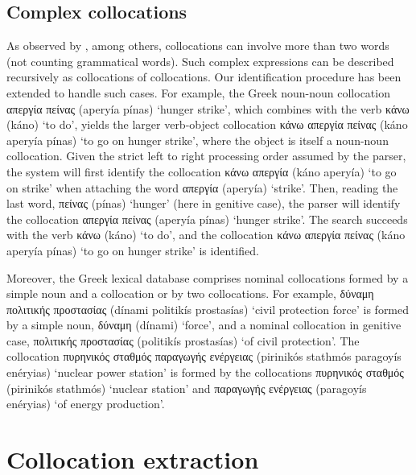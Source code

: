\documentclass[output=paper]{langsci/langscibook}
\begin{document}

\subsection{Complex collocations}
As observed by \cite{heid94}, among others, collocations can involve more than two words (not counting grammatical words). Such complex expressions can be described recursively as collocations of collocations. Our identification procedure has been extended to handle such cases. For example, the Greek noun-noun collocation {απεργία πείνας} (aperyía pínas) `hunger strike', which combines with the verb {κάνω} (káno) `to do', yields the larger verb-object collocation {κάνω απεργία πείνας} (káno aperyía pínas) `to go on hunger strike', where the object is itself a noun-noun collocation. Given the strict left to right processing order assumed by the parser, the system will first identify the collocation {κάνω απεργία} (káno aperyía) `to go on strike' when attaching the word {απεργία} (aperyía) `strike'. Then, reading the last word, {πείνας} (pínas) `hunger' (here in genitive case), the parser will identify the collocation {απεργία πείνας} (aperyía pínas) `hunger strike'. The search succeeds with the verb {κάνω} (káno) `to do', and the collocation {κάνω απεργία πείνας} (káno aperyía pínas) `to go on hunger strike' is identified.

Moreover, the Greek lexical database comprises nominal collocations formed by a simple noun and a collocation or by two collocations. For example, {δύναμη πολιτικής προστασίας} (dínami politikís prostasías) `civil protection force' is for\-med by a simple noun, {δύναμη} (dínami) `force', and a nominal collocation in genitive case, {πολιτικής προστασίας} (politikís prostasías) `of civil protection'. The collocation {πυρηνικός σταθμός παραγωγής ενέργειας} (pirinikós stathmós para\-goyís enéryias) `nuclear power station' is formed by the collocations {πυρηνικός σταθμός} (pirinikós stathmós) `nuclear station' and {παραγωγής ενέργειας} (para\-goyís enéry\-ias) `of energy production'.  


\section{Collocation extraction}
\end{document}
